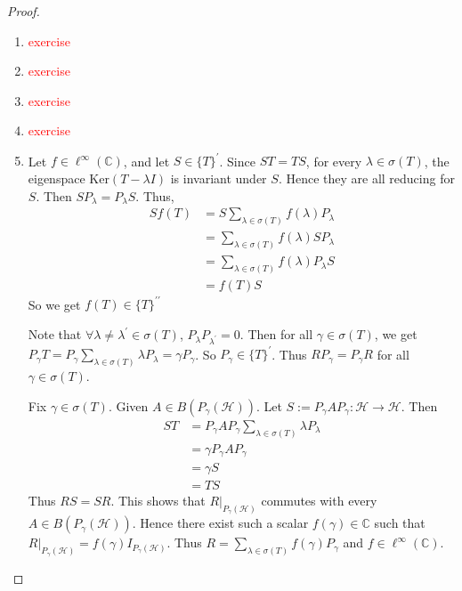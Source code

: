 \begin{proof}
  \begin{enumerate}[label=(\arabic*)]
    \item \textcolor{red}{exercise}
    \item \textcolor{red}{exercise}
    \item \textcolor{red}{exercise}
    \item \textcolor{red}{exercise}
    \item Let $f \in \ell^\infty(\mathbb{C})$, and let $S \in
      \{T\}^\prime$. Since $ ST = TS$, for every $ \lambda \in
      \sigma(T)$, the eigenspace $\textrm{Ker}(T - \lambda I)$ is
      invariant under $S$. Hence they are all reducing for $S$. Then
      $SP_\lambda = P_\lambda S$. Thus,
      \begin{align*}
        Sf(T) &= S \sum_{\lambda \in  \sigma(T)}  f(\lambda)   P_\lambda \\
        &= \sum_{\lambda \in  \sigma(T)} f( \lambda) S P_\lambda \\
        &= \sum_{\lambda \in  \sigma(T)} f(  \lambda) P_\lambda  S \\
        &= f(T) S
      \end{align*}
      So we get $f(T) \in \{ T \}^{\prime \prime}$

      Note that $\forall \lambda \neq \lambda^\prime \in \sigma(T)$,
      $ P_\lambda P_{\lambda^\prime} = 0$. Then for all $\gamma \in
      \sigma(T)$, we get $P_\gamma T = P_\gamma \sum_{\lambda \in
      \sigma(T)}  \lambda P_\lambda  = \gamma P_\gamma$. So $
      P_\gamma \in \{ T \}^\prime$. Thus $RP_\gamma = P_\gamma R$ for
      all $ \gamma \in \sigma(T)$.

      Fix $\gamma \in \sigma(T)$. Given $A \in
      B(P_\gamma(\mathcal{H}))$. Let $    S:= P_\gamma A P_\gamma :
      \mathcal{H} \to \mathcal{H}$. Then
      \begin{align*}
        ST &= P_\gamma AP_\gamma \sum_{\lambda \in  \sigma(T)}
        \lambda P_\lambda \\
        &= \gamma P_\gamma AP_\gamma \\
        &= \gamma S \\
        &= TS
      \end{align*}
      Thus $RS = SR$. This shows that $R|_{P_\gamma(\mathcal{H})}$
      commutes with every $A \in B(P_\gamma(\mathcal{H}))$. Hence
      there exist such a scalar $    f(\gamma) \in \mathbb{C}$ such
      that $R|_{P_\gamma(\mathcal{H})} = f(\gamma) I_{
      P_\gamma(\mathcal{H})}$. Thus $R = \sum_{\lambda \in
      \sigma(T)}  f(\gamma) P_\gamma$ and $ f \in \ell^\infty(\mathbb{C})$.
  \end{enumerate}


\end{proof}
